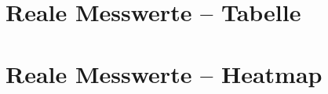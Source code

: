 \documentclass{article}
\begin{document}
\section{Reale Messwerte -- Tabelle}

\section{Reale Messwerte -- Heatmap}

\end{document}
